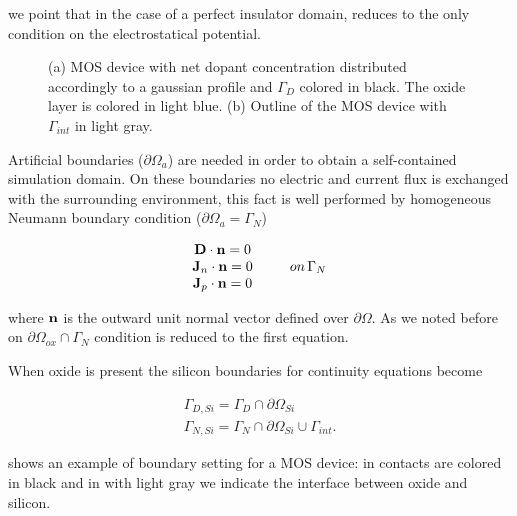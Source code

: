 we point that in the case of a perfect insulator domain,  reduces to the only condition on the electrostatical potential.

\begin{figure}[!b]
\centering
{}
\caption{(a) MOS device with net dopant concentration distributed accordingly to a gaussian profile and $\Gamma_D$ colored in black. The oxide layer is colored in light blue. (b) Outline of the MOS device with $\Gamma_{int}$ in light gray. }
\label{fig: outline boundaries}
\end{figure}

Artificial boundaries ($\partial \Omega_a$) are needed in order to obtain a self-contained simulation domain.  On these boundaries no electric and current flux is exchanged with the surrounding environment, this fact is well performed by homogeneous Neumann boundary condition ($\partial \Omega_a = \Gamma_N$)

\begin{equation}
\label{eq: neumann boundar condition}
\begin{array}{cc}
\vect{D}\cdot \vect{n} = 0 & \\
\vect{J}_n \cdot \vect{n} = 0 & \psp{10} on \, \Gamma_N \\
\vect{J}_p \cdot \vect{n} = 0 & 
\end{array}
\end{equation}

where $\mathbf{n}$ is the outward unit normal vector defined over $\partial \Omega$. 
As we noted before on $\partial \Omega_{ox} \cap \Gamma_N$ condition  is reduced to the first equation.

When oxide is present the silicon boundaries for continuity equations become

\begin{equation}
\begin{array}{c}
\Gamma_{D,Si} = \Gamma_D \cap \partial \Omega_{Si} \\
\Gamma_{N,Si} = \Gamma_N \cap \partial \Omega_{Si} \cup \Gamma_{int}.
\end{array}
\end{equation}

 shows an example of boundary setting for a MOS device: in  contacts are colored in black and in  with light gray we indicate the interface between oxide and silicon.

